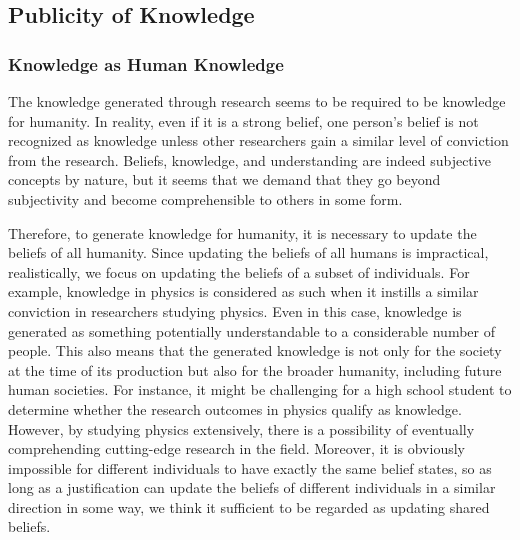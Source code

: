 \documentclass{book}
\begin{document}

\subsection{Publicity of Knowledge}
\subsubsection{Knowledge as Human Knowledge}
The knowledge generated through research seems to be required to be knowledge for humanity. In reality, even if it is a strong belief, one person's belief is not recognized as knowledge unless other researchers gain a similar level of conviction from the research. Beliefs, knowledge, and understanding are indeed subjective concepts by nature, but it seems that we demand that they go beyond subjectivity and become comprehensible to others in some form. 

Therefore, to generate knowledge for humanity, it is necessary to update the beliefs of all humanity. Since updating the beliefs of all humans is impractical, realistically, we focus on updating the beliefs of a subset of individuals. For example, knowledge in physics is considered as such when it instills a similar conviction in researchers studying physics. Even in this case, knowledge is generated as something potentially understandable to a considerable number of people. This also means that the generated knowledge is not only for the society at the time of its production but also for the broader humanity, including future human societies. For instance, it might be challenging for a high school student to determine whether the research outcomes in physics qualify as knowledge. However, by studying physics extensively, there is a possibility of eventually comprehending cutting-edge research in the field. Moreover, it is obviously impossible for different individuals to have exactly the same belief states, so as long as a justification can update the beliefs of different individuals in a similar direction in some way, we think it sufficient to be regarded as updating shared beliefs.
\end{document}
